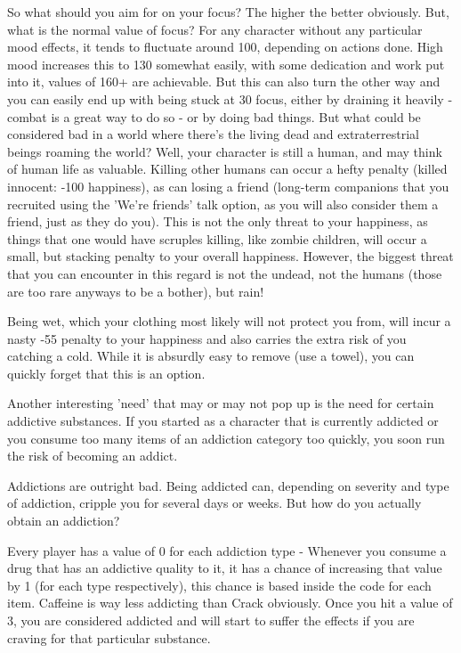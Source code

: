 \documentclass[11pt]{report}
\begin{document}
So what should you aim for on your focus? The higher the better obviously. But, what is the normal value of focus? For any character without any particular mood effects, it tends to fluctuate around 100, depending on actions done. High mood increases this to 130 somewhat easily, with some dedication and work put into it, values of 160+ are achievable. But this can also turn the other way and you can easily end up with being stuck at 30 focus, either by draining it heavily - combat is a great way to do so - or by doing bad things. But what could be considered bad in a world where there's the living dead and extraterrestrial beings roaming the world? Well, your character is still a human, and may think of human life as valuable. Killing other humans can occur a hefty penalty (killed innocent: -100 happiness), as can losing a friend (long-term companions that you recruited using the 'We're friends' talk option, as you will also consider them a friend, just as they do you). This is not the only threat to your happiness, as things that one would have scruples killing, like zombie children, will occur a small, but stacking penalty to your overall happiness. However, the biggest threat that you can encounter in this regard is not the undead, not the humans (those are too rare anyways to be a bother), but rain!

Being wet, which your clothing most likely will not protect you from, will incur a nasty -55 penalty to your happiness and also carries the extra risk of you catching a cold. While it is absurdly easy to remove (use a towel), you can quickly forget that this is an option.

Another interesting 'need' that may or may not pop up is the need for certain addictive substances. If you started as a character that is currently addicted or you consume too many items of an addiction category too quickly, you soon run the risk of becoming an addict.

Addictions are outright bad. Being addicted can, depending on severity and type of addiction, cripple you for several days or weeks. But how do you actually obtain an addiction?

Every player has a value of 0 for each addiction type - Whenever you consume a drug that has an addictive quality to it, it has a chance of increasing that value by 1 (for each type respectively), this chance is based inside the code for each item. Caffeine is way less addicting than Crack obviously. Once you hit a value of 3, you are considered addicted and will start to suffer the effects if you are craving for that particular substance.
\end{document}
